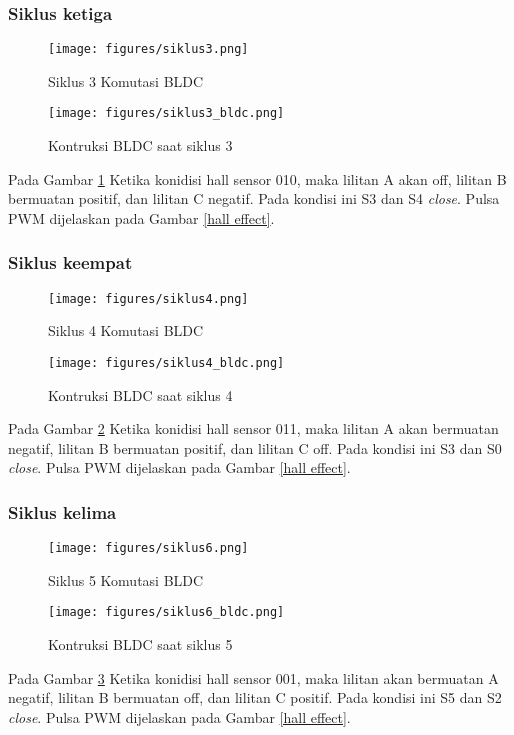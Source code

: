 \subsubsection{Siklus ketiga}
    \begin{figure}[!htb]
        \centering
        \texttt{[image: figures/siklus3.png]}
        \caption{Siklus 3 Komutasi BLDC}
        \label{siklus3}
    \end{figure}

    \begin{figure}[!htb]
        \centering
        \texttt{[image: figures/siklus3\_bldc.png]}
        \caption{Kontruksi BLDC saat siklus 3}
    \end{figure}
    
Pada Gambar \ref{siklus3} Ketika konidisi hall sensor 010, maka lilitan A akan off, lilitan B bermuatan positif, dan lilitan C negatif. Pada kondisi ini S3 dan S4 \textit{close}. Pulsa PWM dijelaskan pada Gambar \ref{hall effect}.

\newpage
\subsubsection{Siklus keempat}
    \begin{figure}[!htb]
        \centering
        \texttt{[image: figures/siklus4.png]}
        \caption{Siklus 4 Komutasi BLDC}
        \label{siklus4}
    \end{figure}

    \begin{figure}[!htb]
        \centering
        \texttt{[image: figures/siklus4\_bldc.png]}
        \caption{Kontruksi BLDC saat siklus 4}
    \end{figure}
Pada Gambar \ref{siklus4} Ketika konidisi hall sensor 011, maka lilitan A akan bermuatan negatif, lilitan B bermuatan positif, dan lilitan C off. Pada kondisi ini S3 dan S0 \textit{close}. Pulsa PWM dijelaskan pada Gambar \ref{hall effect}. 

\newpage
\subsubsection{Siklus kelima}
    \begin{figure}[!htb]
        \centering
        \texttt{[image: figures/siklus6.png]}
        \caption{Siklus 5 Komutasi BLDC}
        \label{siklus5}
    \end{figure}
    \begin{figure}[!htb]
        \centering
        \texttt{[image: figures/siklus6\_bldc.png]}
        \caption{Kontruksi BLDC saat siklus 5}
    \end{figure}
Pada Gambar \ref{siklus5} Ketika konidisi hall sensor 001, maka lilitan akan bermuatan A negatif, lilitan B bermuatan off, dan lilitan C positif. Pada kondisi ini S5 dan S2 \textit{close}. Pulsa PWM dijelaskan pada Gambar \ref{hall effect}.

